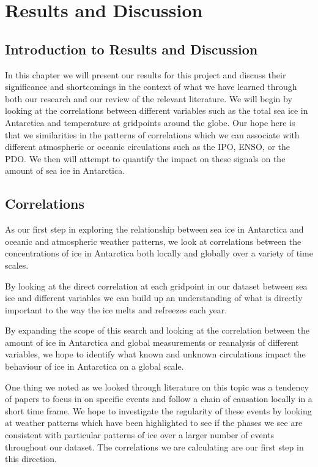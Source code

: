 \part{Results and Discussion}
\label{Chap:Results}

\chapter{Introduction to Results and Discussion}
In this chapter we will present our results for this project and discuss their significance and shortcomings in the context of what we have learned through both our research and our review of the relevant literature. We will begin by looking at the correlations between different variables such as the total sea ice in Antarctica and temperature at gridpoints around the globe. Our hope here is that we similarities in the patterns of correlations which we can associate with different atmospheric or oceanic circulations such as the IPO, ENSO, or the PDO. We then will attempt to quantify the impact on these signals on the amount of sea ice in Antarctica.

\chapter{Correlations}
As our first step in exploring the relationship between sea ice in Antarctica and oceanic and atmospheric weather patterns, we look at correlations between the concentrations of ice in Antarctica both locally and globally over a variety of time scales. 

By looking at the direct correlation at each gridpoint in our dataset between sea ice and different variables we can build up an understanding of what is directly important to the way the ice melts and refreezes each year.

By expanding the scope of this search and looking at the correlation between the amount of ice in Antarctica and global measurements or reanalysis of different variables, we hope to identify what known and unknown circulations impact the behaviour of ice in Antarctica on a global scale.

One thing we noted as we looked through literature on this topic was a tendency of papers to focus in on specific events and follow a chain of causation locally in a short time frame. We hope to investigate the regularity of these events by looking at weather patterns which have been highlighted to see if the phases we see are consistent with particular patterns of ice over a larger number of events throughout our dataset. The correlations we are calculating are our first step in this direction.
\newpage

\newpage

\newpage

\newpage

\newpage

\newpage

\newpage


